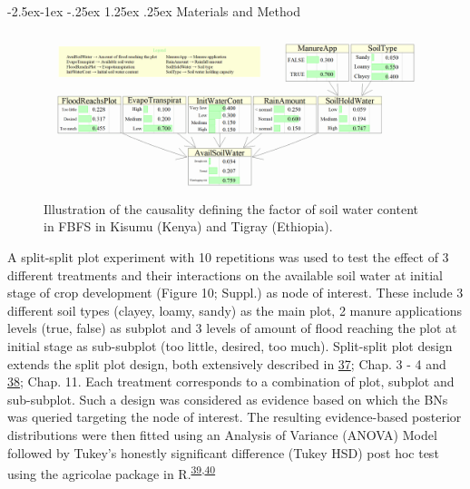 \documentclass[12pt,oneside]{article}
\makeatletter
\renewcommand\paragraph{\@startsection{paragraph}{4}{\z@}%
            {-2.5ex\@plus -1ex \@minus -.25ex}%
            {1.25ex \@plus .25ex}%
            {\normalfont\normalsize\bfseries}}
\makeatother
\begin{document}
\hypertarget{IV212}{%
\paragraph{Materials and Method}\label{IV212}}

\begin{figure}[!htbp]

{\centering \includegraphics[width=1\linewidth,]{figures/Modelling_FBFS_Avail_soil_water} 

}

\caption{Illustration of the causality defining the factor of soil water content in FBFS in Kisumu (Kenya) and Tigray (Ethiopia).}\label{fig:fig5}
\end{figure}

A split-split plot experiment with 10 repetitions was used to test the effect of 3 different treatments and their interactions on the available soil water at initial stage of crop development (Figure 10; Suppl.) as node of interest. These include 3 different soil types (clayey, loamy, sandy) as the main plot, 2 manure applications levels (true, false) as subplot and 3 levels of amount of flood reaching the plot at initial stage as sub-subplot (too little, desired, too much). Split-split plot design extends the split plot design, both extensively described in \protect\hyperlink{ref-Gomez_and_Gomez_1984}{37}; Chap. 3 - 4 and \protect\hyperlink{ref-Panse_and_Sukhatme_1957}{38}; Chap. 11. Each treatment corresponds to a combination of plot, subplot and sub-subplot. Such a design was considered as evidence based on which the BNs was queried targeting the node of interest. The resulting evidence-based posterior distributions were then fitted using an Analysis of Variance (ANOVA) Model followed by Tukey's honestly significant difference (Tukey HSD) post hoc test using the agricolae package in R.\textsuperscript{\protect\hyperlink{ref-DeMendiburu_2016}{39},\protect\hyperlink{ref-RCoreTeam_2018}{40}}
\end{document}

